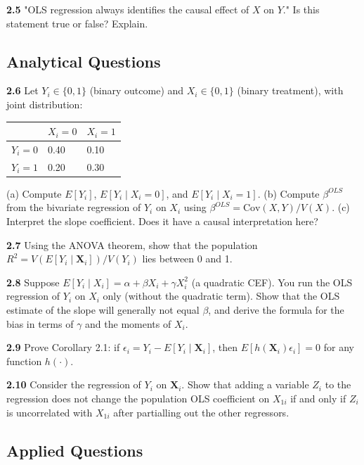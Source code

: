 \textbf{2.5} "OLS regression always identifies the causal effect of $X$ on $Y$." Is this statement true or false? Explain.

\subsection{Analytical Questions}

\textbf{2.6} Let $Y_i \in \{0, 1\}$ (binary outcome) and $X_i \in \{0, 1\}$ (binary treatment), with joint distribution:

\begin{center}
\begin{tabular}{@{} l l l @{}}
\toprule
\textbf{} & \textbf{$X_i = 0$} & \textbf{$X_i = 1$} \\
\midrule
$Y_i = 0$ & 0.40 & 0.10 \\
$Y_i = 1$ & 0.20 & 0.30 \\
\bottomrule
\end{tabular}
\end{center}

(a) Compute $E[Y_i]$, $E[Y_i \mid X_i = 0]$, and $E[Y_i \mid X_i = 1]$.  
(b) Compute $\beta^{OLS}$ from the bivariate regression of $Y_i$ on $X_i$ using $\beta^{OLS} = \text{Cov}(X,Y)/V(X)$.  
(c) Interpret the slope coefficient. Does it have a causal interpretation here?

\textbf{2.7} Using the ANOVA theorem, show that the population $R^2 = V(E[Y_i \mid \mathbf{X}_i]) / V(Y_i)$ lies between 0 and 1.

\textbf{2.8} Suppose $E[Y_i \mid X_i] = \alpha + \beta X_i + \gamma X_i^2$ (a quadratic CEF). You run the OLS regression of $Y_i$ on $X_i$ only (without the quadratic term). Show that the OLS estimate of the slope will generally not equal $\beta$, and derive the formula for the bias in terms of $\gamma$ and the moments of $X_i$.

\textbf{2.9} Prove Corollary 2.1: if $\epsilon_i = Y_i - E[Y_i \mid \mathbf{X}_i]$, then $E[h(\mathbf{X}_i)\epsilon_i] = 0$ for any function $h(\cdot)$.

\textbf{2.10} Consider the regression of $Y_i$ on $\mathbf{X}_i$. Show that adding a variable $Z_i$ to the regression does not change the population OLS coefficient on $X_{1i}$ if and only if $Z_i$ is uncorrelated with $X_{1i}$ after partialling out the other regressors.

\subsection{Applied Questions}

